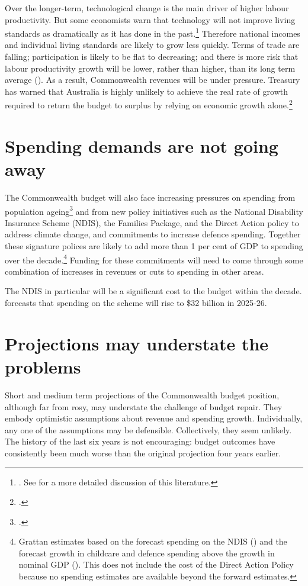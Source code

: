 Over the longer-term, technological change is the main driver of higher labour productivity. But some economists warn that technology will not improve living standards as dramatically as it has done in the past.\footnote{\textcites{Gordon2012}{Cowen2011}. See \textcites{DaleyWoodWeidmannEtAl2014}{Dolamore2015} for a more detailed discussion of this literature.}  Therefore national incomes and individual living standards are likely to grow less quickly. Terms of trade are falling; participation is likely to be flat to decreasing; and there is more risk that labour productivity growth will be lower, rather than higher, than its long term average (). As a result, Commonwealth revenues will be under pressure. Treasury has warned that Australia is highly unlikely to achieve the real rate of growth required to return the budget to surplus by relying on economic growth alone.\footcite{Parkinson2014}  

\section{Spending demands are not going away\label{sec:FISCAL-3-2}}
The Commonwealth budget will also face increasing pressures on spending from population ageing\footcite{Hockey2015IGR}  and from new policy initiatives such as the National Disability Insurance Scheme (NDIS), the Families Package, and the Direct Action policy to address climate change, and commitments to increase defence spending. Together these signature polices are likely to add more than 1 per cent of GDP to spending over the decade.\footnote{Grattan estimates based on the forecast spending on the NDIS (\textcite{Commission2014})
and the forecast growth in childcare and defence spending above the growth in nominal GDP (\textcite{NationalCommissionAudit2014}). This does not include the cost of the Direct Action Policy because no spending estimates are available beyond the forward estimates. 
}  Funding for these commitments will need to come through some combination of increases in revenues or cuts to spending in other areas. 

The NDIS in particular will be a significant cost to the budget within the decade. \textcite[][5]{PBO2015} forecasts that spending on the scheme will rise to \$32 billion in 2025-26. 

\section{Projections may understate the problems\label{sec:FISCAL-3-3}}
Short and medium term projections of the Commonwealth budget position, although far from rosy, may understate the challenge of budget repair. They embody optimistic assumptions about revenue and spending growth. Individually, any one of the assumptions may be defensible. Collectively, they seem unlikely. The history of the last six years is not encouraging: budget outcomes have consistently been much worse than the original projection four years earlier.

